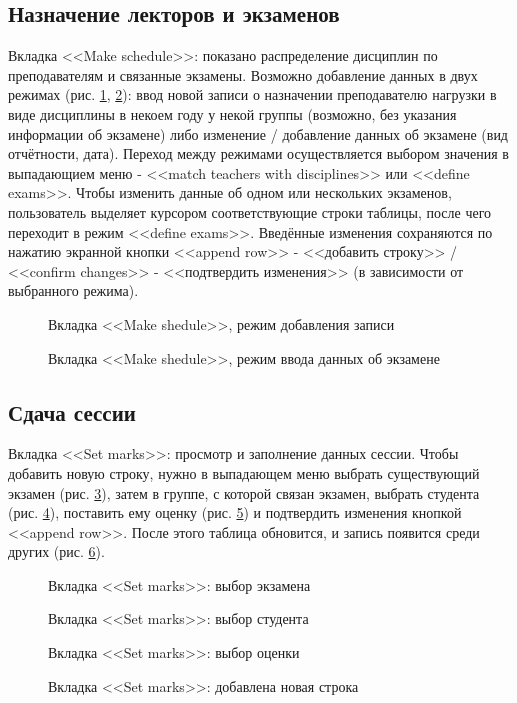 \documentclass[zuevDbReport.tex]{subfiles}
\begin{document}
\subsection{Назначение лекторов и экзаменов}
Вкладка <<Make schedule>>: показано распределение дисциплин по преподавателям и связанные экзамены. Возможно добавление данных в двух режимах  (рис. \ref{mkSched},  \ref{mkSched2}): ввод новой записи о назначении преподавателю нагрузки  в виде дисциплины в некоем году у некой группы (возможно, без указания информации об экзамене) либо изменение / добавление данных об экзамене (вид отчётности, дата). Переход между режимами осуществляется выбором значения в выпадающием меню - <<match teachers with disciplines>> или <<define exams>>.
Чтобы изменить данные об одном или нескольких экзаменов, пользователь выделяет курсором соответствующие строки таблицы, после чего переходит в режим <<define exams>>. Введённые изменения сохраняются по нажатию экранной кнопки <<append row>> - <<добавить строку>> / <<confirm changes>> - <<подтвердить изменения>> (в зависимости от выбранного режима).
\begin{figure}[H]
\caption{Вкладка <<Make shedule>>, режим добавления записи}
\label{mkSched}
\end{figure}
\begin{figure}[H]
\caption{Вкладка <<Make shedule>>, режим ввода данных об экзамене}
\label{mkSched2}
\end{figure}

\newpage
\subsection{Сдача сессии}
Вкладка <<Set marks>>: просмотр и заполнение данных сессии. Чтобы добавить новую строку, нужно в выпадающем меню выбрать существующий экзамен (рис. \ref{marks1}), затем в группе, с которой связан экзамен, выбрать студента (рис. \ref{marks2}), поставить ему оценку (рис. \ref{marks3}) и подтвердить изменения кнопкой <<append row>>. После этого таблица обновится, и запись появится среди других (рис. \ref{marks5}).
\begin{figure}[H]
\caption{Вкладка <<Set marks>>: выбор экзамена}
\label{marks1}
\end{figure}
\begin{figure}[H]
\caption{Вкладка <<Set marks>>: выбор студента}
\label{marks2}
\end{figure}
\vspace{-5 pt}
\begin{figure}[H]
\caption{Вкладка <<Set marks>>: выбор оценки}
\label{marks3}
\end{figure}
\begin{figure}[H]
\caption{Вкладка <<Set marks>>: добавлена новая строка}
\label{marks5}
\end{figure}
\end{document}
